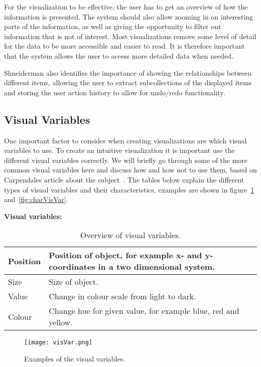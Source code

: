 For the visualization to be effective, the user has to get an overview of how the information is presented. The system should also allow zooming in on interesting parts of the information, as well as giving the opportunity to filter out information that is not of interest. Most visualizations remove some level of detail for the data to be more accessible and easier to read. It is therefore important that the system allows the user to access more detailed data when needed.

Shneiderman also identifies the importance of showing the relationships between different items, allowing the user to extract subcollections of the displayed items and storing the user action history to allow for undo/redo functionality.

\subsection{Visual Variables} 
One important factor to consider when creating visualizations are which visual variables to use. To create an intuitive visualization it is important use the different visual variables correctly. We will briefly go through some of the more common visual variables here and discuss how and how not to use them, based on Carpendales article about the subject~\cite{carpendale}. The tables below explain the different types of visual variables and their characteristics, examples are shown in figure~\ref{fig:visVar} and~\ref{fig:charVisVar}.

\textbf{Visual variables:}
\begin{table}[h!]
  \begin{tabular}{|l|p{10cm}|}
      \hline
      Position    & Position of object, for example x- and y-coordinates in a two dimensional system. \\ \hline
      Size        & Size of object. \\ \hline
      Value       & Change in colour scale from light to dark. \\ \hline
      Colour      & Change hue for given value, for example blue, red and yellow. \\ \hline
  \end{tabular}
  \caption{Overview of visual variables.}
\end{table}

\begin{figure}[h!]
	\centering
		\texttt{[image: visVar.png]}
		\caption{\footnotesize Examples of the visual variables.}
		\label{fig:visVar}
\end{figure}

